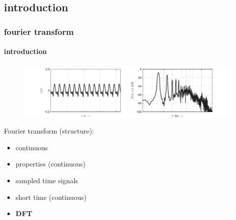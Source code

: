 \subsection{introduction}
	\begin{frame}\frametitle{fourier transform}\framesubtitle{introduction}
		\begin{figure}
			\centering
				\includegraphics[scale=.5]{graph/fft}
		\end{figure}
		Fourier transform (structure):
		\begin{itemize}
			\item	continuous 
			\item	properties (continuous)
			\item	sampled time signals
			\item	short time (continuous)
			\pause
			\item	\textbf{DFT}
		\end{itemize}
	\end{frame}	
